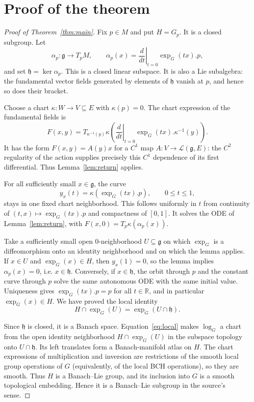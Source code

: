 \documentclass[11pt]{article}
\newcommand{\g}{\mathfrak g}
\newcommand{\h}{\mathfrak h}
\newcommand{\R}{\mathbb R}
\begin{document}
\section{Proof of the theorem}

\begin{proof}[Proof of Theorem~\ref{thm:main}]
Fix $p\in M$ and put $H=G_p$.  It is a closed subgroup.  Let
\[
 \alpha_p:\g\longrightarrow T_pM,
 \qquad \alpha_p(x)=\left.\frac d{dt}\right|_{t=0}\exp_G(tx).p,
\]
and set $\h=\ker\alpha_p$.  This is a closed linear subspace.  It is also a
Lie subalgebra: the fundamental vector fields generated by elements of
$\h$ vanish at $p$, and hence so does their bracket.

Choose a chart $\kappa:W\to V\subseteq E$ with $\kappa(p)=0$.  The chart
expression of the fundamental fields is
\[
 F(x,y)=T_{\kappa^{-1}(y)}\kappa
 \left(\left.\frac d{dt}\right|_{t=0}
       \exp_G(tx).\kappa^{-1}(y)\right).
\]
It has the form $F(x,y)=A(y)x$ for a $C^1$ map
$A:V\to\mathcal L(\g,E)$: the $C^2$ regularity of the action supplies
precisely this $C^1$ dependence of its first differential.  Thus
Lemma~\ref{lem:return} applies.

For all sufficiently small $x\in\g$, the curve
\[
 y_x(t)=\kappa(\exp_G(tx).p),\qquad 0\leq t\leq1,
\]
stays in one fixed chart neighborhood.  This follows uniformly in $t$ from
continuity of $(t,x)\mapsto\exp_G(tx).p$ and compactness of $[0,1]$.
It solves the ODE of Lemma~\ref{lem:return}, with
$F(x,0)=T_p\kappa(\alpha_p(x))$.

Take a sufficiently small open $0$-neighborhood $U\subseteq\g$ on which
$\exp_G$ is a diffeomorphism onto an identity neighborhood and on which the
lemma applies.  If $x\in U$ and $\exp_G(x)\in H$, then $y_x(1)=0$, so the
lemma implies $\alpha_p(x)=0$, i.e. $x\in\h$.  Conversely, if $x\in\h$,
the orbit through $p$ and the constant curve through $p$ solve the same
autonomous ODE with the same initial value.  Uniqueness gives
$\exp_G(tx).p=p$ for all $t\in\R$, and in particular $\exp_G(x)\in H$.
We have proved the local identity
\begin{equation}\label{eq:local}
 H\cap\exp_G(U)=\exp_G(U\cap\h).
\end{equation}

Since $\h$ is closed, it is a Banach space.  Equation~\eqref{eq:local}
makes $\log_G$ a chart from the open identity neighborhood
$H\cap\exp_G(U)$ in the subspace topology onto $U\cap\h$.  Its left
translates form a Banach-manifold atlas on $H$.  The chart expressions of
multiplication and inversion are restrictions of the smooth local group
operations of $G$ (equivalently, of the local BCH operations), so they are
smooth.  Thus $H$ is a Banach--Lie group, and its inclusion into $G$ is a
smooth topological embedding.  Hence it is a Banach--Lie subgroup in the
source's sense.
\end{proof}
\end{document}

